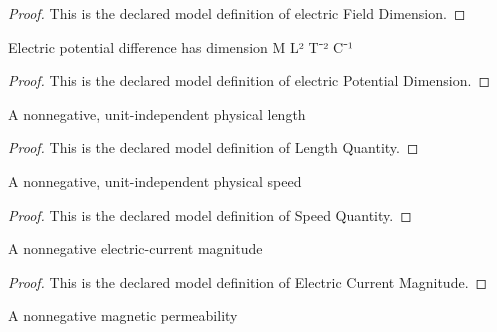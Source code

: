 \begin{proof}
  This is the declared model definition of electric Field Dimension.
\end{proof}
\begin{definition}
  \label{def:physics:phyx-mini-0883:phyxminiproblems-problemphyxmini0883-electricpotentialdimension}
  Electric potential difference has dimension M L² T⁻² C⁻¹
\end{definition}
\begin{proof}
  This is the declared model definition of electric Potential Dimension.
\end{proof}
\begin{definition}
  \label{def:physics:phyx-mini-0883:phyxminiproblems-problemphyxmini0883-lengthquantity}
  A nonnegative, unit-independent physical length
\end{definition}
\begin{proof}
  This is the declared model definition of Length Quantity.
\end{proof}
\begin{definition}
  \label{def:physics:phyx-mini-0883:phyxminiproblems-problemphyxmini0883-speedquantity}
  A nonnegative, unit-independent physical speed
\end{definition}
\begin{proof}
  This is the declared model definition of Speed Quantity.
\end{proof}
\begin{definition}
  \label{def:physics:phyx-mini-0883:phyxminiproblems-problemphyxmini0883-electriccurrentmagnitude}
  A nonnegative electric-current magnitude
\end{definition}
\begin{proof}
  This is the declared model definition of Electric Current Magnitude.
\end{proof}
\begin{definition}
  \label{def:physics:phyx-mini-0883:phyxminiproblems-problemphyxmini0883-magneticpermeabilityquantity}
  A nonnegative magnetic permeability
\end{definition}
